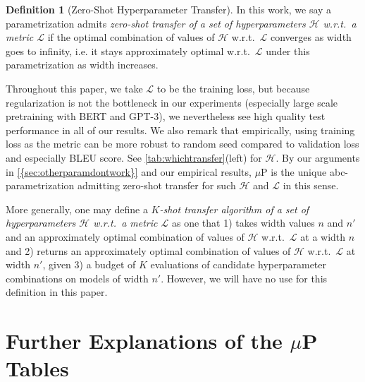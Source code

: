 \documentclass{article}
\theoremstyle{definition}
\newtheorem{defn}{Definition}[section]
\begin{document}
\begin{defn}[Zero-Shot Hyperparameter Transfer]
  In this work, we say a parametrization admits \emph{zero-shot transfer of a set of hyperparameters $\mathcal H$ w.r.t.\ a metric $\mathcal L$} if the optimal combination of values of $\mathcal H$ w.r.t.\ $\mathcal L$ converges as width goes to infinity, i.e. it stays approximately optimal w.r.t.\ $\mathcal L$ under this parametrization as width increases.
\end{defn}
Throughout this paper, we take $\mathcal L$ to be the training loss, but because regularization is not the bottleneck in our experiments (especially large scale pretraining with BERT and GPT-3), we nevertheless see high quality test performance in all of our results.
We also remark that empirically, using training loss as the metric can be more robust to random seed compared to validation loss and especially BLEU score.
See \cref{tab:whichtransfer}(left) for $\mathcal H$.
By our arguments in \cref{{sec:otherparamdontwork}} and our empirical results, $\mu$P is the unique abc-parametrization admitting zero-shot transfer for such $\mathcal H$ and $\mathcal L$ in this sense.

More generally, one may define a \emph{$K$-shot transfer algorithm of a set of hyperparameters $\mathcal H$ w.r.t.\ a metric $\mathcal L$} as one that 1) takes width values $n$ and $n'$ and an approximately optimal combination of values of $\mathcal H$ w.r.t.\ $\mathcal L$ at a width $n$ and 2) returns an approximately optimal combination of values of $\mathcal H$ w.r.t.\ $\mathcal L$ at width $n'$, given 3) a budget of $K$ evaluations of candidate hyperparameter combinations on models of width $n'$.
However, we will have no use for this definition in this paper.

\section{Further Explanations of the \texorpdfstring{$\mu$P}{muP} Tables}
\label{sec:furtherexplain}
\end{document}

